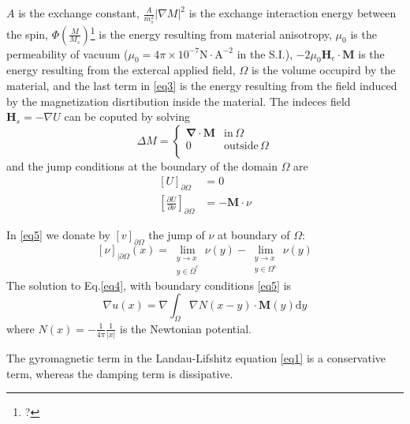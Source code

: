\documentclass{article}
\begin{document}
$A$ is the exchange constant, $\displaystyle\frac{A}{m_s^2}\left|\nabla M\right|^2$ is the exchange interaction energy between the spin, $\displaystyle \Phi\left(\frac{M}{M_s}\right)$\footnote{?} is the energy resulting from material anisotropy, $\mu_0$ is the permeability of vacuum ($\displaystyle\mu_0=4\pi\times10^{-7}\mathrm{N}\cdot \mathrm{A}^{-2}$ in the S.I.), $-2\mu_0\bm{H}_e\cdot \bm{M}$ is the energy resulting from the extercal applied field, $\Omega$ is the volume occupird by the material, and the last term in \eqref{eq3} is the energy resulting from the field induced by the magnetization disrtibution inside the material. The indeces field $\bm{H}_s=-\nabla U$ can be coputed by solving
\begin{equation}
\Delta M=\left\{\begin{array}{ll}
\bm{\nabla}\cdot \bm{M} & \text{in}\,\Omega \\ 
0 & \text{outside}\,\Omega \\ 
\end{array} \right.\label{eq4}
\end{equation}
and the jump conditions at the boundary of the domain $\Omega$ are
\begin{equation}
\begin{split}
\left[U\right]_{\partial \Omega}&=0 \\
\left[\frac{\partial U}{\partial \nu}\right]_{\partial \Omega}&=-\bm{M}\cdot \nu\label{eq5}
\end{split}
\end{equation}

In \eqref{eq5} we donate by $\displaystyle\left[v\right]_{\partial \Omega}$ the jump of $\nu$ at boundary of $\Omega$:
\begin{equation}
\left[\nu\right]_{|\partial \Omega}\left(x\right)=\lim_{\substack{y \to x\\y\in\bar{\Omega}^c}}\nu\left(y\right)-\lim_{\substack{y \to x\\y\in\Omega^c}}\nu\left(y\right)\label{eq6}
\end{equation}
The solution to Eq.\eqref{eq4}, with boundary conditions \eqref{eq5} is
\begin{equation}
\nabla u\left(x\right)=\nabla \int_\Omega \nabla N\left(x-y\right)\cdot \bm{M}\left(y\right)\mathrm{d} y\label{eq7}
\end{equation}
where $\displaystyle N\left(x\right)=-\frac{1}{4\pi}\frac{1}{\left|x\right|}$ is the Newtonian potential.

The gyromagnetic term in the Landau-Lifshitz equation \eqref{eq1} is a conservative term,
whereas the damping term is dissipative.
\end{document}
